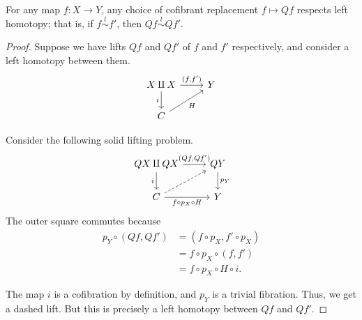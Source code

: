 \documentclass[main.tex]{subfiles}
\begin{document}
\begin{lemma}
  \label{lemma:cofibrant_replacement_respects_left_homotopy}
  For any map $f\colon X \to Y$, any choice of cofibrant replacement $f \mapsto Qf$ respects left homotopy; that is, if $f \overset{l}{\sim} f'$, then $Qf \overset{l}{\sim} Qf'$.
\end{lemma}
\begin{proof}
  Suppose we have lifts $Qf$ and $Qf'$ of $f$ and $f'$ respectively, and consider a left homotopy between them.
  \begin{equation*}
    \begin{tikzcd}
      X \amalg X
      \arrow[d, swap, "i"]
      \arrow[r, "{(f, f')}"]
      & Y
      \\
      C
      \arrow[ur, swap, "H"]
    \end{tikzcd}
  \end{equation*}

  Consider the following solid lifting problem.
  \begin{equation*}
    \begin{tikzcd}
      QX \amalg QX
      \arrow[r, "{(Qf, Qf')}"]
      \arrow[d, swap, "i"]
      & QY
      \arrow[d, "p_{Y}"]
      \\
      C
      \arrow[r, swap, "f \circ p_{X} \circ H"]
      \arrow[ur, dashed]
      & Y
    \end{tikzcd}
  \end{equation*}
  The outer square commutes because
  \begin{align*}
    p_{Y} \circ (Qf, Qf') &= (f \circ p_{X}, f' \circ p_{X})
    \\
    &= f \circ p_{X} \circ (f, f')
    \\
    &= f \circ p_{X} \circ H \circ i.
  \end{align*}

  The map $i$ is a cofibration by definition, and $p_{Y}$ is a trivial fibration. Thus, we get a dashed lift. But this is precisely a left homotopy between $Qf$ and $Qf'$.
\end{proof}
\end{document}
